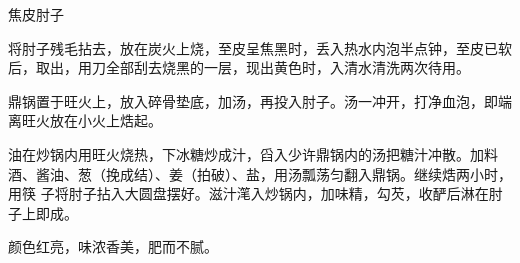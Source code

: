 %
%
%
%
%
%
%
\begin{recipe}{焦皮肘子}

\ingredients


\preparation

\step 将肘子残毛拈去，放在炭火上烧，至皮呈焦黑时，丢入热水内泡半点钟，至皮已软
后，取出，用刀全部刮去烧黑的一层，现出黄色时，入清水清洗两次待用。

\step 鼎锅置于旺火上，放入碎骨垫底，加汤，再投入肘子。汤一冲开，打净血泡，即端
离旺火放在小火上焅起。

\step 油在炒锅内用旺火烧热，下冰糖炒成汁，舀入少许鼎锅内的汤把糖汁冲散。加料
酒、酱油、葱（挽成结）、姜（拍破）、盐，用汤瓢荡匀翻入鼎锅。继续焅两小时，用筷
子将肘子拈入大圆盘摆好。滋汁滗入炒锅内，加味精，勾芡，收酽后淋在肘子上即成。

\features

颜色红亮，味浓香美，肥而不腻。

\end{recipe}

